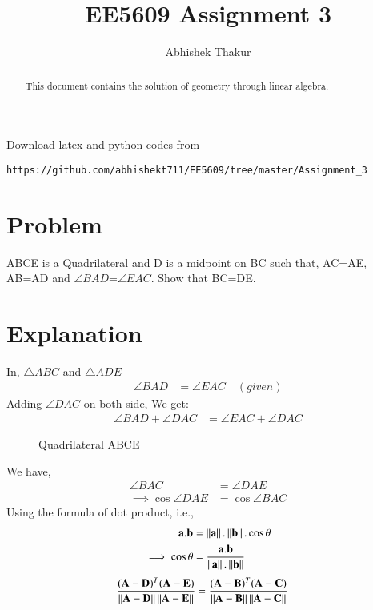 \documentclass[journal,12pt,twocolumn]{IEEEtran}
\begin{document}
     \def\rightbox#1{\makebox[0in][r]{#1}}
     \def\centbox#1{\makebox[0in]{#1}}
     \def\topbox#1{\raisebox{-\baselineskip}[0in][0in]{#1}}
     \def\midbox#1{\raisebox{-0.5\baselineskip}[0in][0in]{#1}}
\vspace{3cm}
\title{EE5609 Assignment 3}
\author{Abhishek Thakur}
\maketitle
\newpage
\bigskip
\renewcommand{\thefigure}{\theenumi}
\renewcommand{\thetable}{\theenumi}
\begin{abstract}
This document contains the solution of geometry through linear algebra.
\end{abstract}
Download latex and python codes from 
\begin{lstlisting}
https://github.com/abhishekt711/EE5609/tree/master/Assignment_3
\end{lstlisting}
%
\section{Problem}
ABCE is a Quadrilateral and D is a midpoint on BC such that, AC=AE, AB=AD and $\angle BAD$=$\angle EAC$. Show that BC=DE.
\section{Explanation}
In, $\triangle{ABC}$ and $\triangle{ADE}$
\begin{align} 
\angle BAD &= \angle EAC \quad (given) \label{eq1}
\end{align}
Adding $\angle DAC$ on both side, We get:
\begin{align}
 \angle BAD + \angle DAC &= \angle EAC + \angle DAC \label{eqn_2} 
\end{align}

\begin{figure}[!htb]
	\centering
    \centering
\resizebox{\columnwidth}{!}{}
	\caption{Quadrilateral ABCE}
\end{figure}
We have,
\begin{align}
 \angle BAC &= \angle DAE \label{eq3}\\
 \implies \cos\angle DAE  &=  \cos\angle BAC \label{eq8}
\end{align}
Using the formula of dot product, i.e.,
\begin{align}
\mathbf{a}.\mathbf{b}&=\left\lVert\mathbf{a}\right\rVert. \left\lVert\mathbf{b}\right\rVert. \cos\theta \label{eq9}\\
\implies \cos\theta &= \frac{\mathbf{a}.\mathbf{b}}{\left\lVert\mathbf{a}\right\rVert.\left\lVert\mathbf{b}\right\rVert} \label{eq10}
\end{align}
\begin{align}
 \frac{(\mathbf A -\mathbf D)^T(\mathbf{A}-\mathbf{E})} {\left\lVert\mathbf{A}-\mathbf{D}\right\rVert \left\lVert\mathbf{A}-\mathbf{E}\right\rVert } 
 &= \frac{(\mathbf A -\mathbf B)^T(\mathbf{A}-\mathbf{C})} {\left\lVert\mathbf{A}-\mathbf{B}\right\rVert \left\lVert\mathbf{A}-\mathbf{C}\right\rVert}\label{eq11}
 \end{align}
\end{document}
